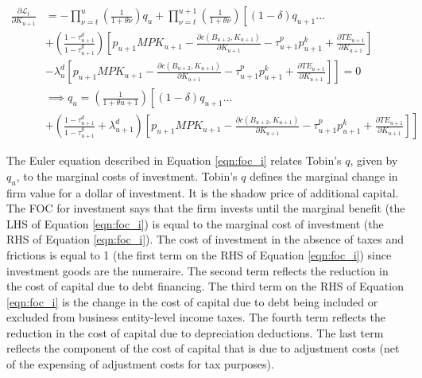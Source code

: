  \begin{equation}
\label{eqn:foc_k}
\begin{split}
 \frac{\partial \mathcal{L}_{t}}{\partial K_{u+1}}  &=  - \prod_{\nu=t}^{u}\left(\frac{1}{1+\theta{\nu}}\right)q_{u}  + \prod_{\nu=t}^{u+1}\left(\frac{1}{1+\theta{\nu}}\right)\left[(1-
\delta)q_{u+1} ... \right. \\
&\left. +    \left(\frac{1-\tau^{d}_{u+1}}{1-\tau^{g}_{u+1}}\right)\left[p_{u+1}MPK_{u+1} - \frac{\partial c(B_{u+2},K_{u+1})}{\partial K_{u+1}}-\tau^{p}_{u+1}p^{k}_{u+1}+\frac{\partial TE_{u+1}}{\partial K_{u+1}} \right] \right. \\
& \left. - \lambda^{d}_{u}\left[p_{u+1}MPK_{u+1} - \frac{\partial c(B_{u+2},K_{u+1})}{\partial K_{u+1}}-\tau^{p}_{u+1}p^{k}_{u+1}+\frac{\partial TE_{u+1}}{\partial K_{u+1}} \right] \right] = 0 \\
&\implies q_{u} = \left(\frac{1}{1+\theta{u+1}}\right)\left[(1-\delta)q_{u+1} ... \right. \\
& \left. +  \left(\frac{1-\tau^{d}_{u+1}}{1-\tau^{g}_{u+1}} + \lambda^{d}_{u+1} \right)\left[p_{u+1}MPK_{u+1} - \frac{\partial c(B_{u+2},K_{u+1})}{\partial K_{u+1}}-\tau^{p}_{u+1}p^{k}_{u+1}+\frac{\partial TE_{u+1}}{\partial K_{u+1}} \right] \right]
\end{split}
\end{equation}

\noindent\noindent The Euler equation described in Equation \ref{eqn:foc_i} relates Tobin's $q$, given by $q_{u}$, to the marginal costs of investment.  Tobin's $q$ defines the marginal change in firm value for a dollar of investment. It is the shadow price of additional capital.  The FOC for investment says that the firm invests until the marginal benefit (the LHS of Equation \ref{eqn:foc_i}) is equal to the marginal cost of investment (the RHS of Equation \ref{eqn:foc_i}).  The cost of investment in the absence of taxes and frictions is equal to 1 (the first term on the RHS of Equation \ref{eqn:foc_i}) since investment goods are the numeraire.  The second term reflects the reduction in the cost of capital due to debt financing.  The third term on the RHS of Equation \ref{eqn:foc_i} is the change in the cost of capital due to debt being included or excluded from business entity-level income taxes.  The fourth term reflects the reduction in the cost of capital due to depreciation deductions.  The last term reflects the component of the cost of capital that is due to adjustment costs (net of the expensing of adjustment costs for tax purposes).



